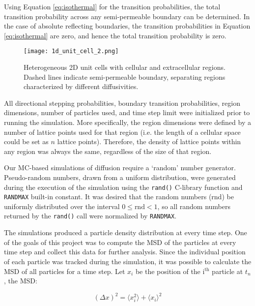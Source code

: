 	Using Equation \ref{eq:isothermal} for the transition probabilities, the total transition probability across any semi-permeable boundary can be determined. In the case of absolute reflecting boundaries, the transition probabilities in Equation \ref{eq:isothermal} are zero, and hence the total transition probability is zero.
	
	\begin{figure}[h]
		\centering
		\texttt{[image: 1d\_unit\_cell\_2.png]}
		\caption{Heterogeneous 2D unit cells with cellular and extracellular regions. Dashed lines indicate semi-permeable boundary, separating regions characterized by different diffusivities.}
		\label{fig:1d_unit_cell_2.png}
	\end{figure}
	
	\newpage
	All directional stepping probabilities, boundary transition probabilities, region dimensions, number of particles used, and time step limit were initialized prior to running the simulation. More specifically, the region dimensions were defined by a number of lattice points used for that region (i.e. the length of a cellular space could be set as $ n $ lattice points). Therefore, the density of lattice points within any region was always the same, regardless of the size of that region. 
	 	
	Our MC-based simulations of diffusion require a `random' number generator. Pseudo-random numbers, drawn from a uniform distribution, were generated during the execution of the simulation using the \texttt{rand()} C-library function and \texttt{RAND\textunderscore MAX} built-in constant. It was desired that the random numbers (rnd) be uniformly distributed over the interval $ 0 \leq \textrm{rnd} < 1 $, so all random numbers returned by the \texttt{rand()} call were normalized by \texttt{RAND\textunderscore MAX}.
	
	The simulations produced a particle density distribution at every time step. One of the goals of this project was to compute the MSD of the particles at every time step and collect this data for further analysis. Since the individual position of each particle was tracked during the simulation, it was possible to calculate the MSD of all particles for a time step. Let $ x_i $ be the position of the $ \textrm{i}^\textrm{th} $ particle at $ t_n $, the MSD:
	
	\begin{equation}
		(\Delta x)^2 = \langle x_{i}^2 \rangle + \langle x_i \rangle^2
	\end{equation}
	

